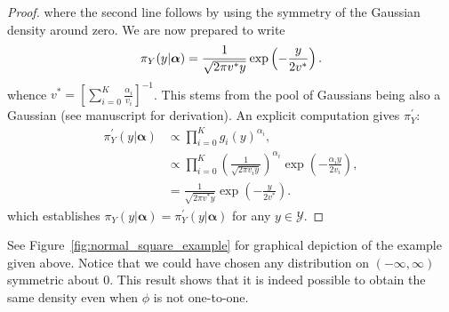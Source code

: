 \documentclass[a4paper, notitlepage, 10pt]{article}
\begin{document}
\begin{proof}
where the second line follows by using the symmetry of the Gaussian density around zero.
We are now prepared to write 
\begin{equation}
 \pi_Y(y |  \boldsymbol \alpha) = \frac{1}{\sqrt{2\pi v^\ast y}} \exp\left(-\frac{y}{2v^\ast}\right). \\
\end{equation}
whence $v^\ast =  \left[\sum_{i=0}^K \frac{\alpha_i}{v_i} \right]^{-1}$.
This stems from the pool of Gaussians being also a Gaussian (see manuscript for derivation).
An explicit computation gives $\pi^{\prime}_{Y}$:
\begin{align}
 \pi^{\prime}_{Y}(y|  \boldsymbol \alpha) &\propto \prod_{i=0}^K g_i(y)^{\alpha_i}, \\
 & \propto \prod_{i=0}^K \left( \frac{1}{\sqrt{2\pi v_i y}} \right)^{\alpha_i} \exp\left(-\frac{\alpha_i y}{2v_i}\right),\\
 &= \frac{1}{\sqrt{2\pi v^\ast y}} \exp\left(-\frac{y}{2v^\ast}\right).
\end{align}
which establishes $ \pi_{Y}(y|  \boldsymbol \alpha) =  \pi^{\prime}_{Y}(y|  \boldsymbol \alpha)$ for any $ y \in \mathcal{Y}$.
\end{proof}
See Figure~\ref{fig:normal_square_example} for graphical depiction of the example given above.
Notice that we could have chosen any distribution on $(-\infty, \infty)$ symmetric about $0$.
This result shows that it is indeed possible to obtain the same density even when $\phi$ is not one-to-one.
\end{document}
